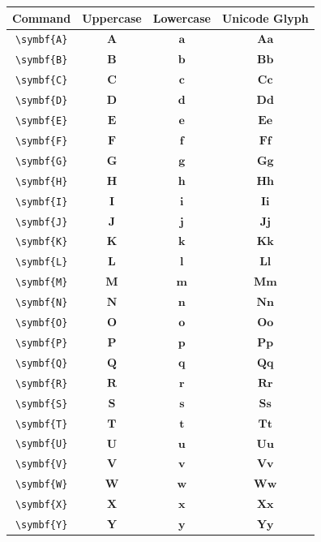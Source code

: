 \documentclass[12pt,a4paper]{article}
\begin{document}
\begin{longtable}{|c|c|c|c|}
\hline
\textbf{Command} & \textbf{Uppercase} & \textbf{Lowercase} & \textbf{Unicode Glyph} \\
\hline
\verb|\symbf{A}| & $\symbf{A}$ & $\symbf{a}$ & $ 𝐀 𝐚 $ \\
\verb|\symbf{B}| & $\symbf{B}$ & $\symbf{b}$ & $ 𝐁 𝐛 $ \\
\verb|\symbf{C}| & $\symbf{C}$ & $\symbf{c}$ & $ 𝐂 𝐜 $ \\
\verb|\symbf{D}| & $\symbf{D}$ & $\symbf{d}$ & $ 𝐃 𝐝 $ \\
\verb|\symbf{E}| & $\symbf{E}$ & $\symbf{e}$ & $ 𝐄 𝐞 $ \\
\verb|\symbf{F}| & $\symbf{F}$ & $\symbf{f}$ & $ 𝐅 𝐟 $ \\
\verb|\symbf{G}| & $\symbf{G}$ & $\symbf{g}$ & $ 𝐆 𝐠 $ \\
\verb|\symbf{H}| & $\symbf{H}$ & $\symbf{h}$ & $ 𝐇 𝐡 $ \\
\verb|\symbf{I}| & $\symbf{I}$ & $\symbf{i}$ & $ 𝐈 𝐢 $ \\
\verb|\symbf{J}| & $\symbf{J}$ & $\symbf{j}$ & $ 𝐉 𝐣 $ \\
\verb|\symbf{K}| & $\symbf{K}$ & $\symbf{k}$ & $ 𝐊 𝐤 $ \\
\verb|\symbf{L}| & $\symbf{L}$ & $\symbf{l}$ & $ 𝐋 𝐥 $ \\
\verb|\symbf{M}| & $\symbf{M}$ & $\symbf{m}$ & $ 𝐌 𝐦 $ \\
\verb|\symbf{N}| & $\symbf{N}$ & $\symbf{n}$ & $ 𝐍 𝐧 $ \\
\verb|\symbf{O}| & $\symbf{O}$ & $\symbf{o}$ & $ 𝐎 𝐨 $ \\
\verb|\symbf{P}| & $\symbf{P}$ & $\symbf{p}$ & $ 𝐏 𝐩 $ \\
\verb|\symbf{Q}| & $\symbf{Q}$ & $\symbf{q}$ & $ 𝐐 𝐪 $ \\
\verb|\symbf{R}| & $\symbf{R}$ & $\symbf{r}$ & $ 𝐑 𝐫 $ \\
\verb|\symbf{S}| & $\symbf{S}$ & $\symbf{s}$ & $ 𝐒 𝐬 $ \\
\verb|\symbf{T}| & $\symbf{T}$ & $\symbf{t}$ & $ 𝐓 𝐭 $ \\
\verb|\symbf{U}| & $\symbf{U}$ & $\symbf{u}$ & $ 𝐔 𝐮 $ \\
\verb|\symbf{V}| & $\symbf{V}$ & $\symbf{v}$ & $ 𝐕 𝐯 $ \\
\verb|\symbf{W}| & $\symbf{W}$ & $\symbf{w}$ & $ 𝐖 𝐰 $ \\
\verb|\symbf{X}| & $\symbf{X}$ & $\symbf{x}$ & $ 𝐗 𝐱 $ \\
\verb|\symbf{Y}| & $\symbf{Y}$ & $\symbf{y}$ & $ 𝐘 𝐲 $ \\

\end{longtable}
\end{document}
